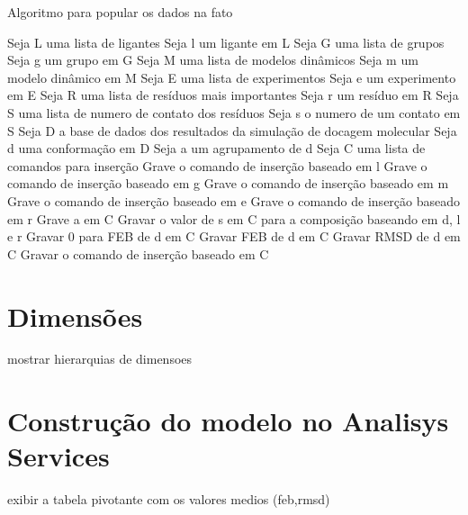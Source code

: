 \begin{algorithm}[H]
\caption{Algoritmo para popular os dados na fato}
\label{ciraDadosFato}
{\fontsize{10}{10}\selectfont
\begin{algorithmic}[1]
	\STATE Seja L uma lista de ligantes
	\STATE Seja l um ligante em L
	\STATE Seja G uma lista de grupos
	\STATE Seja g um grupo em G
	\STATE Seja M uma lista de modelos dinâmicos
	\STATE Seja m um modelo dinâmico em M
	\STATE Seja E uma lista de experimentos
	\STATE Seja e um experimento em E
	\STATE Seja R uma lista de resíduos mais importantes
	\STATE Seja r um resíduo em R
	\STATE Seja S uma lista de numero de contato dos resíduos
	\STATE Seja s o numero de um contato em S
	\STATE Seja D a base de dados dos resultados da simulação de docagem molecular
	\STATE Seja d uma conformação em D
	\STATE Seja a um agrupamento de d
	\STATE Seja C uma lista de comandos para inserção
		\STATE Grave o comando de inserção baseado em l
	\ENDFOR
		\STATE Grave o comando de inserção baseado em g
        \ENDFOR
		\STATE Grave o comando de inserção baseado em m
        \ENDFOR
		\STATE Grave o comando de inserção baseado em e
        \ENDFOR
		\STATE Grave o comando de inserção baseado em r
	\ENDFOR
		\STATE Grave a em C
				\STATE Gravar o valor de s em C para a composição baseando em d, l e r
			\ENDFOR
				\STATE Gravar 0 para FEB de d em C
			\ELSE
				\STATE Gravar FEB de d em C
			\ENDIF
			\STATE Gravar RMSD de d em C
			\STATE Gravar o comando de inserção baseado em C
		\ENDFOR
	\ENDFOR
\end{algorithmic}
}
\end{algorithm}


\section{Dimensões}
	mostrar hierarquias de dimensoes
	
\section{Construção do modelo no Analisys Services}
	exibir a tabela pivotante com os valores medios (feb,rmsd)
